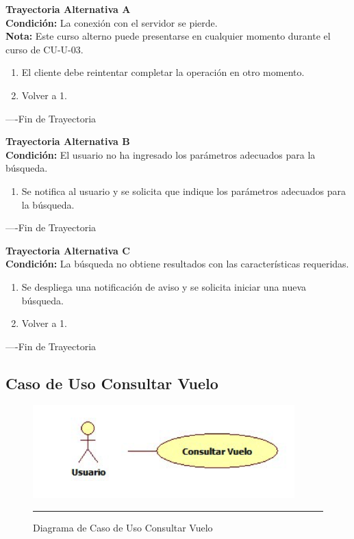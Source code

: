 \begin{flushleft}
	\hypertarget{TrayectoriaA_CU-U-03}{}
	\textbf{Trayectoria Alternativa A}\\
	\textbf{Condición:} La conexión con el servidor se pierde. \\
	\textbf{Nota: } Este curso alterno puede presentarse en cualquier momento durante el curso de CU-U-03. \\	
	\begin{enumerate}
		\item El cliente debe reintentar completar la operación en otro momento. 
		\item Volver a 1. 
	\end{enumerate}
\end{flushleft}
----Fin de Trayectoria

\begin{flushleft}
	\hypertarget{TrayectoriaB_CU-U-03}{}
	\textbf{Trayectoria Alternativa B}\\
	\textbf{Condición:} El usuario no ha ingresado los parámetros adecuados para la búsqueda. \\
	\begin{enumerate}
		\item  Se notifica al usuario y se solicita que indique los parámetros adecuados para la búsqueda.
	\end{enumerate}
\end{flushleft}
----Fin de Trayectoria

\begin{flushleft}
	\hypertarget{TrayectoriaC_CU-U-03}{}
	\textbf{Trayectoria Alternativa C}\\
	\textbf{Condición:} La búsqueda no obtiene resultados con las características requeridas. \\
	\begin{enumerate}
		\item Se despliega una notificación de aviso y se solicita iniciar una nueva búsqueda. 
		\item Volver a 1.
	\end{enumerate}
\end{flushleft}
----Fin de Trayectoria
\newpage
\subsection{Caso de Uso Consultar Vuelo}

\begin{figure}[htbp]
	\centering
		\includegraphics[width=0.9\textwidth]{Figuras/cuConsultarVuelo.png}
		\rule{30em}{0.5pt}
	\caption[Diagrama de Caso de Uso Consultar Vuelo]{Diagrama de Caso de Uso Consultar Vuelo}
	\label{fig:cuConsultarVuelo}
\end{figure}

